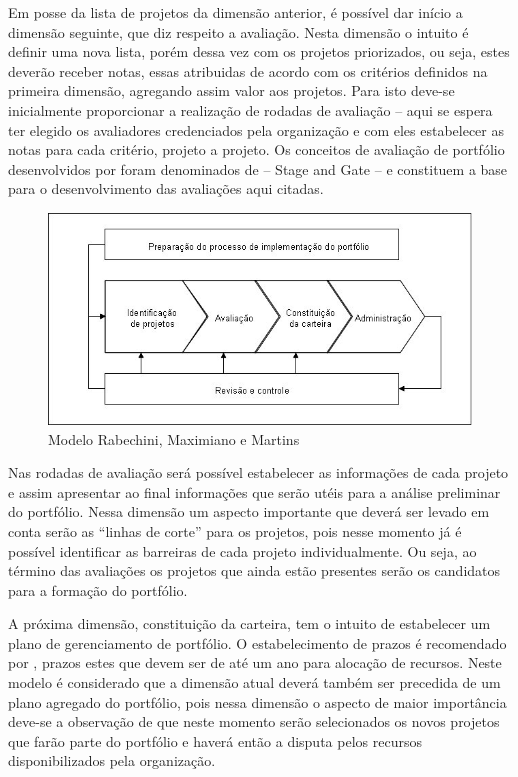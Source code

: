 \documentclass[a4paper,10pt]{article}
\begin{document}
\flushleft
Em posse da lista de projetos da dimensão anterior, é possível dar início a dimensão seguinte, que diz respeito a avaliação. Nesta dimensão
o intuito é definir uma nova lista, porém dessa vez com os projetos priorizados, ou seja, estes deverão receber notas, essas atribuidas de acordo com
os critérios definidos na primeira dimensão, agregando assim valor aos projetos. Para isto deve-se inicialmente
proporcionar a realização de rodadas de avaliação – aqui se espera ter elegido os avaliadores credenciados pela
organização e com eles estabelecer as notas para cada critério, projeto a projeto. Os conceitos de avaliação de
portfólio desenvolvidos por \cite{cooper} foram denominados de – Stage and Gate – e constituem a base para o desenvolvimento das avaliações aqui citadas.


\begin{figure}[ht]
\centering
\includegraphics[width=.7\textwidth]{rabechini.jpg}
\caption{Modelo Rabechini, Maximiano e Martins}
\label{fig:exampleFig1}
\end{figure}

\flushleft
Nas rodadas de avaliação será possível estabelecer as informações de cada projeto e assim apresentar ao final informações que serão
utéis para a análise preliminar do portfólio. Nessa dimensão um aspecto importante que deverá ser levado em conta serão as ``linhas de corte''
para os projetos, pois nesse momento já é possível identificar as barreiras de cada projeto individualmente. Ou seja, ao término das avaliações
os projetos que ainda estão presentes serão os candidatos para a formação do portfólio.

\flushleft
A próxima dimensão, constituição da carteira, tem o intuito de estabelecer
um plano de gerenciamento de portfólio. O estabelecimento de prazos é recomendado por \cite{clark}, prazos estes
que devem ser de até um ano para alocação de recursos. Neste modelo é considerado que a dimensão atual deverá também
ser precedida de um plano agregado do portfólio, pois nessa dimensão o aspecto de maior importância deve-se a observação de que
neste momento serão selecionados os novos projetos que farão parte do portfólio e haverá então a disputa pelos recursos disponibilizados pela organização.
\end{document}
